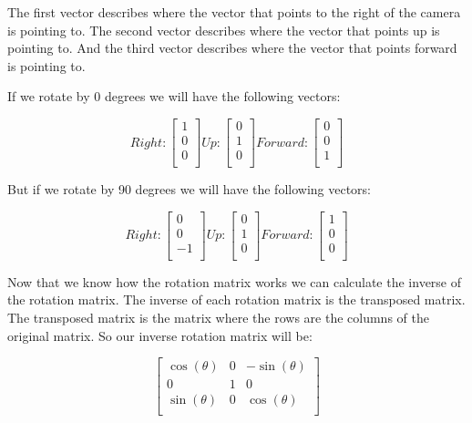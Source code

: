\documentclass[12pt]{report} \usepackage{preamble}
\begin{document}
The first vector describes where the vector that points to the right of the camera is pointing to.
The second vector describes where the vector that points up is pointing to.
And the third vector describes where the vector that points forward is pointing to.

If we rotate by 0 degrees we will have the following vectors:

\[
	Right:
	\begin{bmatrix}
		1 \\
		0 \\
		0 \\
	\end{bmatrix}
	Up:
	\begin{bmatrix}
		0 \\
		1 \\
		0 \\
	\end{bmatrix}
	Forward:
	\begin{bmatrix}
		0 \\
		0 \\
		1 \\
	\end{bmatrix}
\]

But if we rotate by 90 degrees we will have the following vectors:

\[
	Right:
	\begin{bmatrix}
		0  \\
		0  \\
		-1 \\
	\end{bmatrix}
	Up:
	\begin{bmatrix}
		0 \\
		1 \\
		0 \\
	\end{bmatrix}
	Forward:
	\begin{bmatrix}
		1 \\
		0 \\
		0 \\
	\end{bmatrix}
\]

Now that we know how the rotation matrix works we can calculate the inverse of the rotation matrix.
The inverse of each rotation matrix is the transposed matrix. The transposed matrix is the matrix where the rows are the columns of the original matrix.
So our inverse rotation matrix will be:

\[
	\begin{bmatrix}
		\cos(\theta) & 0 & -\sin(\theta) \\
		0            & 1 & 0             \\
		\sin(\theta) & 0 & \cos(\theta)  \\
	\end{bmatrix}
\]
\end{document}

